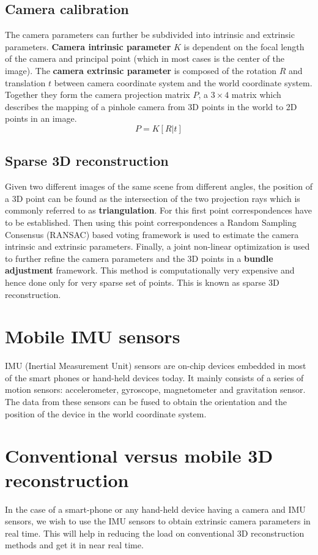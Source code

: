 \documentclass{article}
\begin{document}
			\subsection{Camera calibration}
				The camera parameters can further be subdivided into intrinsic and extrinsic parameters. \textbf{Camera intrinsic parameter} $K$ is dependent on the focal length of the camera and principal point (which in most cases is the center of the image). The \textbf{camera extrinsic parameter} is composed of the rotation $R$ and translation $t$ between camera coordinate system and the world coordinate system. Together they form the camera projection matrix $P$, a $3 \times 4$ matrix which describes the mapping of a pinhole camera from 3D points in the world to 2D points in an image.
				\begin{equation}
				P = K[R|t]
				\end{equation}
			
			\subsection{Sparse 3D reconstruction} 
				Given two different images of the same scene from different angles, the position of a 3D point can be found as the intersection of the two projection rays which is commonly referred to as \textbf{triangulation}. For this first point correspondences have to be established. Then using this point correspondences a Random Sampling Consensus (RANSAC) based voting framework is used to estimate the camera intrinsic and extrinsic parameters. Finally, a joint non-linear optimization is used to further refine the camera parameters and the 3D points in a \textbf{bundle adjustment} framework. This method is computationally very expensive and hence done only for very sparse set of points. This is known as sparse 3D reconstruction.

			\section{Mobile IMU sensors}
				IMU (Inertial Measurement Unit) sensors are on-chip devices embedded in most of the smart phones or hand-held devices today. It mainly consists of a series of motion sensors: accelerometer, gyroscope, magnetometer and gravitation sensor. The data from these sensors can be fused to obtain the orientation and the position of the device in the world coordinate system.

			\section{Conventional versus mobile 3D reconstruction}
				In the case of a smart-phone or any hand-held device having a camera and IMU sensors, we wish to use  the IMU sensors to obtain extrinsic camera parameters in real time. This will help in reducing the load on conventional 3D reconstruction methods and get it in near real time.
\end{document}
